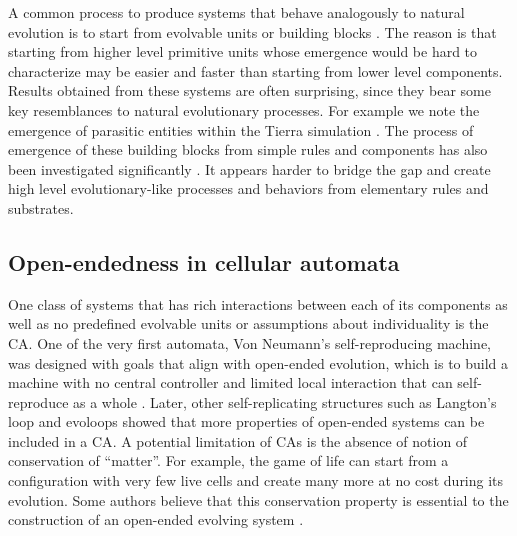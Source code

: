 A common process to produce systems that behave analogously to natural evolution
is to start from evolvable units or building blocks
\parencite{srayApproachSynthesisLife1991, simsEvolvingVirtualCreatures1994,
  ofriaAvidaSoftwarePlatform2004, yaegerComputationalGeneticsPhysiology1994,
  channonImprovingStillPassing2003, spectorDivisionBlocksOpenended2007,
  sorosIdentifyingNecessaryConditions2014}. The reason is that starting from
higher level primitive units whose emergence would be hard to characterize may
be easier and faster than starting from lower level components. Results obtained
from these systems are often surprising, since they bear some key resemblances
to natural evolutionary processes. For example we note the emergence of
parasitic entities within the Tierra simulation
\parencite{srayApproachSynthesisLife1991}. The process of emergence of these
building blocks from simple rules and components has also been investigated
significantly \parencite{bagleySpontaneousEmergenceMetabolism1991,
  huttonEvolvableSelfReproducingCells2007, flammEvolutionMetabolicNetworks2010,
  sayamaSeekingOpenendedEvolution2011}. It appears harder to bridge the gap and
create high level evolutionary-like processes and behaviors from elementary
rules and substrates.

\subsection{Open-endedness in cellular automata}
One class of systems that has rich interactions between each of its components as
well as no predefined evolvable units or assumptions about individuality is the
\ac{CA}. One of the very first automata, Von Neumann's self-reproducing machine,
was designed with goals that align with open-ended evolution, which is to build
a machine with no central controller and limited local interaction that can
self-reproduce as a whole
\parencite{vonneumannTheorySelfreproducingAutomata1966,
  pesaventoImplementationNeumannSelfReproducing1995}. Later, other
self-replicating structures such as Langton's loop
\parencite{langtonSelfreproductionCellularAutomata1984} and evoloops
\parencite{sayamaNewStructurallyDissolvable1999,
  salzbergComplexGeneticEvolution2004} showed that more properties of open-ended
systems can be included in a \ac{CA}. A potential limitation of \acp{CA} is the
absence of notion of conservation of ``matter''. For example, the game of life
can start from a configuration with very few live cells and create many more at
no cost during its evolution. Some authors believe that this conservation
property is essential to the construction of an open-ended evolving system
\parencite{taylorChapterCreativityEvolution2002}.

